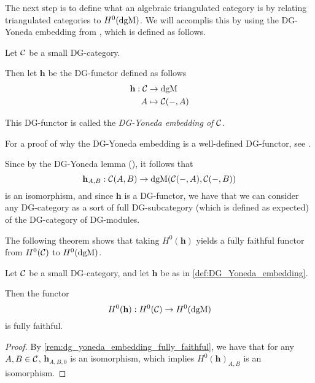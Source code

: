 The next step is to define what an algebraic triangulated category is by relating triangulated categories to \( H^0(\operatorname{dgM}) \). We will accomplis this by using the DG-Yoneda embedding from \cite[Corollary 6.3.6]{Borceux_1994}, which is defined as follows.
\begin{definition}
    \label{def:DG_Yoneda_embedding}
    Let \( {\mathcal{C}} \) be a small DG-category.
    
    Then let \( \mathbf{h} \) be the DG-functor defined as follows
    \begin{align*}
        \mathbf{h}: {\mathcal{C}} &\to \operatorname{dgM} \\
        A &\mapsto {\mathcal{C}}(-, A)
    \end{align*}

    This DG-functor is called the \emph{DG-Yoneda embedding of \( {\mathcal{C}} \)}.
\end{definition}

For a proof of why the DG-Yoneda embedding is a well-defined DG-functor, see \cite[Corollary 6.3.6]{Borceux_1994}.

\begin{remark}
    \label{rem:dg_yoneda_embedding_fully_faithful}
    Since by the DG-Yoneda lemma (\cite[Corollary 6.3.5]{Borceux_1994}), it follows that
    \[
        \mathbf{h}_{A, B}: {\mathcal{C}}(A, B) \to \operatorname{dgM}({\mathcal{C}}(-, A), {\mathcal{C}}(-, B))
    \]
    is an isomorphism, and since \( \mathbf{h} \) is a DG-functor, we have that we can consider any DG-category as a sort of full DG-subcategory (which is defined as expected) of the DG-category of DG-modules.
\end{remark}

The following theorem shows that taking \( H^0(\mathbf{h}) \) yields a fully faithful functor from \( H^0({\mathcal{C}}) \) to \( H^0(\operatorname{dgM}) \).

\begin{lemma}
    Let \( {\mathcal{C}} \) be a small DG-category, and let \( \mathbf{h} \) be as in \autoref{def:DG_Yoneda_embedding}.

    Then the functor
    \[
        H^0(\mathbf{h}): H^0({\mathcal{C}}) \to H^0(\operatorname{dgM})
    \]
    is fully faithful.
\end{lemma}
\begin{proof}
    By \autoref{rem:dg_yoneda_embedding_fully_faithful}, we have that for any \( A, B \in {\mathcal{C}} \), \( \mathbf{h}_{A, B, 0} \) is an isomorphism, which implies \( H^0(\mathbf{h})_{A, B} \) is an isomorphism.
\end{proof}

